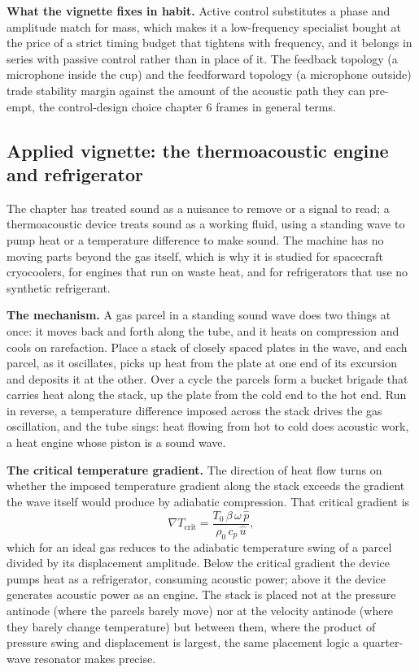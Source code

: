 \textbf{What the vignette fixes in habit.} Active control substitutes a phase
and amplitude match for mass, which makes it a low-frequency specialist bought
at the price of a strict timing budget that tightens with frequency, and it
belongs in series with passive control rather than in place of it. The
feedback topology (a microphone inside the cup) and the feedforward topology
(a microphone outside) trade stability margin against the amount of the
acoustic path they can pre-empt, the control-design choice chapter 6 frames
in general terms.

\subsection{Applied vignette: the thermoacoustic engine and refrigerator}

The chapter has treated sound as a nuisance to remove or a signal to read; a
thermoacoustic device treats sound as a working fluid, using a standing wave
to pump heat or a temperature difference to make sound. The machine has no
moving parts beyond the gas itself, which is why it is studied for
spacecraft cryocoolers, for engines that run on waste heat, and for
refrigerators that use no synthetic refrigerant.

\textbf{The mechanism.} A gas parcel in a standing sound wave does two
things at once: it moves back and forth along the tube, and it heats on
compression and cools on rarefaction. Place a stack of closely spaced plates
in the wave, and each parcel, as it oscillates, picks up heat from the plate
at one end of its excursion and deposits it at the other. Over a cycle the
parcels form a bucket brigade that carries heat along the stack, up the
plate from the cold end to the hot end. Run in reverse, a temperature
difference imposed across the stack drives the gas oscillation, and the tube
sings: heat flowing from hot to cold does acoustic work, a heat engine whose
piston is a sound wave.

\textbf{The critical temperature gradient.} The direction of heat flow turns
on whether the imposed temperature gradient along the stack exceeds the
gradient the wave itself would produce by adiabatic compression. That
critical gradient is
\[
\nabla T_{\text{crit}} = \frac{T_0\,\beta\,\omega\,\hat p}
                              {\rho_0\,c_p\,\hat u},
\]
which for an ideal gas reduces to the adiabatic temperature swing of a
parcel divided by its displacement amplitude. Below the critical gradient
the device pumps heat as a refrigerator, consuming acoustic power; above it
the device generates acoustic power as an engine. The stack is placed not at
the pressure antinode (where the parcels barely move) nor at the velocity
antinode (where they barely change temperature) but between them, where the
product of pressure swing and displacement is largest, the same
placement logic a quarter-wave resonator makes precise.

